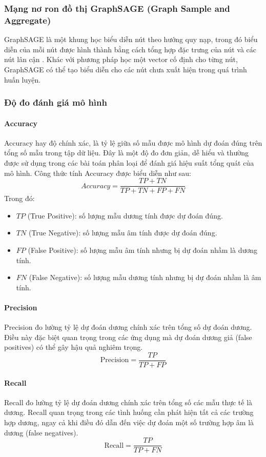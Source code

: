 \documentclass[10pt,twoside]{article}
\begin{document}
\subsubsection{Mạng nơ ron đồ thị GraphSAGE (Graph Sample and Aggregate)}
GraphSAGE là một khung học biểu diễn nút theo hướng quy nạp, trong đó biểu diễn của mỗi nút được hình thành bằng cách tổng hợp đặc trưng của nút và các nút lân cận \cite{hamilton_inductive_2018}. Khác với phương pháp học một vector cố định cho từng nút, GraphSAGE có thể tạo biểu diễn cho các nút chưa xuất hiện trong quá trình huấn luyện.
\subsubsection{Độ đo đánh giá mô hình} 
\paragraph{Accuracy} 
Accuracy \cite{grandini_metrics_2020} hay độ chính xác, là tỷ lệ giữa số mẫu được mô hình dự đoán đúng trên tổng số mẫu trong tập dữ liệu. Đây là một độ đo đơn giản, dễ hiểu và thường được sử dụng trong các bài toán phân loại để đánh giá hiệu suất tổng quát của mô hình. Công thức tính Accuracy được biểu diễn như sau: 
\begin{equation} Accuracy = \frac{TP + TN}{TP + TN + FP + FN} 
\end{equation} Trong đó: 
\begin{itemize} 
\item $TP$ (True Positive): số lượng mẫu dương tính được dự đoán đúng. 
\item $TN$ (True Negative): số lượng mẫu âm tính được dự đoán đúng. 
\item $FP$ (False Positive): số lượng mẫu âm tính nhưng bị dự đoán nhầm là dương tính. 
\item $FN$ (False Negative): số lượng mẫu dương tính nhưng bị dự đoán nhầm là âm tính. 
\end{itemize}
\paragraph{Precision} 
Precision \cite{grandini_metrics_2020} đo lường tỷ lệ dự đoán dương chính xác trên tổng số dự đoán dương. Điều này đặc biệt quan trọng trong các ứng dụng mà dự đoán dương giả (false positives) có thể gây hậu quả nghiêm trọng.
\begin{equation} 
\mathrm{Precision}=\frac{TP}{TP+FP}
\end{equation}
\paragraph{Recall} 
Recall \cite{grandini_metrics_2020} đo lường tỷ lệ dự đoán dương chính xác trên tổng số các mẫu thực tế là dương. Recall quan trọng trong các tình huống cần phát hiện tất cả các trường hợp dương, ngay cả khi điều đó dẫn đến việc dự đoán một số trường hợp âm là dương (false negatives).
\begin{equation} 
\mathrm{Recall}=\frac{TP}{TP+FN}
\end{equation}
\end{document}
